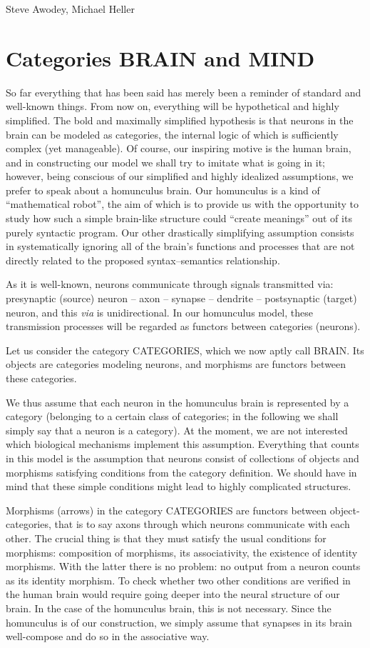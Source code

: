 \begin{artengenv2auth}{Steve Awodey, Michael Heller}
\section{Categories BRAIN and MIND}
So far everything that has been said has merely been a reminder of standard and well-known things. From now on, everything will be hypothetical and highly simplified. The bold and maximally simplified hypothesis is that neurons in the brain can be modeled as categories, the internal logic of which is sufficiently complex (yet manageable). Of course, our inspiring motive is the human brain, and in constructing our model we shall try to imitate what is going in it; however, being conscious of our simplified and highly idealized assumptions, we prefer to speak about a homunculus brain. Our homunculus is a kind of ``mathematical robot'', the aim of which is to provide us with the opportunity to study how such a simple brain-like structure could ``create meanings'' out of its purely syntactic program. Our other drastically simplifying assumption consists in systematically ignoring all of the brain's functions and processes that are not directly related to the proposed syntax--semantics relationship.

As it is well-known, neurons communicate through signals transmitted via: presynaptic (source) neuron -- axon --  synapse -- dendrite -- postsynaptic (target) neuron, and this \textit{via} is unidirectional. In our homunculus model, these transmission processes will be regarded as functors between categories (neurons). 

Let us consider the category CATEGORIES, which we now aptly call BRAIN. Its objects are categories modeling neurons, and morphisms are functors between these categories.

We thus assume that each neuron in the homunculus brain is represented by a category (belonging to a certain class of categories; in the following we shall simply say that a neuron is a category). At the moment, we are not interested which biological mechanisms implement this assumption. Everything that counts in this model is the assumption that neurons consist of collections of objects and morphisms satisfying conditions from the category definition. We should have in mind that these simple conditions might lead to highly complicated structures.

Morphisms (arrows) in the category CATEGORIES are functors between object-categories, that is to say axons through which neurons communicate with each other. The crucial thing is that they must satisfy the usual conditions for morphisms: composition of morphisms, its associativity, the existence of identity morphisms. With the latter there is no problem: no output from a neuron counts as its identity morphism. To check whether two other conditions are verified in the human brain would require going deeper into the neural structure of our brain. In the case of the homunculus brain, this is not necessary. Since the homunculus is of our construction, we simply assume that synapses in its brain well-compose and do so in the associative way.


\end{artengenv2auth}
